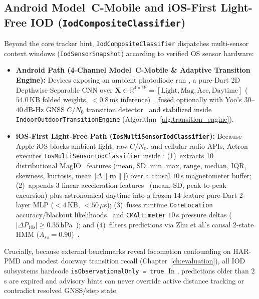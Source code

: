 \subsection{Android Model~C-Mobile and iOS-First Light-Free IOD (\texorpdfstring{\texttt{IodCompositeClassifier}}{IodCompositeClassifier})}
Beyond the core tracker hint, \texttt{IodCompositeClassifier} dispatches multi-sensor context windows (\texttt{IodSensorSnapshot}) according to verified OS sensor hardware:
\begin{itemize}
    \item \textbf{Android Path (4-Channel Model~C-Mobile \& Adaptive Transition Engine):} Devices exposing an ambient photodiode run , a pure-Dart 2D Depthwise-Separable CNN over $\mathbf{X} \in \mathbb{R}^{4 \times W} = [\text{Light}, \text{Mag}, \text{Acc}, \text{Daytime}]$ ($54.0$\,KB folded weights, $<0.8$\,ms inference)~\cite{dastagir2024deepiod}, fused optionally with Yoo's $30$--$40$\,dB-Hz GNSS $C/N_0$ transition detector~\cite{yoo2025seamless} and stabilized inside \texttt{IndoorOutdoorTransitionEngine} (Algorithm~\ref{alg:transition_engine}).
    \item \textbf{iOS-First Light-Free Path (\texttt{IosMultiSensorIodClassifier}):} Because Apple iOS blocks ambient light, raw $C/N_0$, and cellular radio APIs, Aetron executes \texttt{IosMultiSensorIodClassifier} inside :
    (1)~extracts 10 distributional MagIO~\cite{ashraf2018magio} features (mean, SD, min, max, range, median, IQR, skewness, kurtosis, mean $|\Delta \|\mathbf{m}\||$) over a causal $10$\,s magnetometer buffer; (2)~appends 3 linear acceleration features~\cite{kelishomi2019activities} (mean, SD, peak-to-peak excursion) plus astronomical daytime into a frozen 14-feature pure-Dart 2-layer MLP ($<4$\,KB, $<50$\,$\mu$s); (3)~fuses runtime \texttt{CoreLocation} accuracy/blackout likelihoods~\cite{bui2020gpsiod} and \texttt{CMAltimeter} $10$\,s pressure deltas ($|\Delta P_{10\text{s}}| \ge 0.35$\,hPa~\cite{feriol2020review}); and (4)~filters predictions via Zhu et al.'s causal 2-state HMM ($A_{ss} = 0.90$)~\cite{zhu2019fast}.
\end{itemize}

Crucially, because external benchmarks reveal locomotion confounding on HAR-PMD and modest doorway transition recall (Chapter~\ref{ch:evaluation}), all IOD subsystems hardcode \texttt{isObservationalOnly = true}. In , predictions older than $2$\,s are expired and advisory hints can never override active distance tracking or contradict resolved GNSS/step state.

